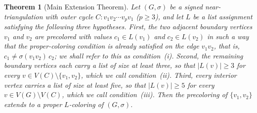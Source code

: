 \documentclass[10pt,a4paper]{amsart}
\newtheorem{theorem}{Theorem}
\newcommand{\Gs}{(G,\sigma)}
\newcommand{\V}{V}
\begin{document}
\begin{theorem}[Main Extension Theorem]\label{thm:main}
Let $\Gs$ be a signed near-triangulation with outer cycle
$C\colon v_1v_2\cdots v_pv_1$ ($p\ge 3$), and let $L$ be a list
assignment satisfying the following three hypotheses. First, the
two adjacent boundary vertices $v_1$ and $v_2$ are precolored with
values $c_1\in L(v_1)$ and $c_2\in L(v_2)$ in such a way that the
proper-coloring condition is already satisfied on the edge $v_1v_2$,
that is, $c_1\ne\sigma(v_1v_2)\,c_2$; we shall refer to this as
condition~(i). Second, the remaining boundary vertices each carry
a list of size at least three, so that $|L(v)|\ge 3$ for every
$v\in\V(C)\setminus\{v_1,v_2\}$, which we call condition~(ii).
Third, every interior vertex carries a list of size at least five,
so that $|L(v)|\ge 5$ for every $v\in\V(G)\setminus\V(C)$, which
we call condition~(iii). Then the precoloring of $\{v_1,v_2\}$
extends to a proper $L$-coloring of $\Gs$.
\end{theorem}
\end{document}
